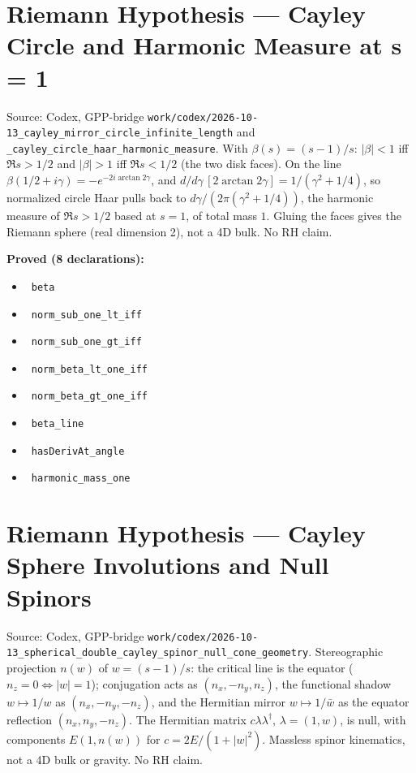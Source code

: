 \documentclass{report}
\theoremstyle{definition}
\begin{document}
\section{Riemann Hypothesis --- Cayley Circle and Harmonic Measure at s = 1}
Source: Codex, GPP-bridge \texttt{work/codex/2026-10-13\_cayley\_mirror\_circle\_infinite\_length} and \texttt{\_cayley\_circle\_haar\_harmonic\_measure}. With $\beta(s)=(s-1)/s$: $|\beta|<1$ iff $\Re s>1/2$ and $|\beta|>1$ iff $\Re s<1/2$ (the two disk faces). On the line $\beta(1/2+i\gamma)=-e^{-2i\arctan 2\gamma}$, and $d/d\gamma\,[2\arctan 2\gamma]=1/(\gamma^2+1/4)$, so normalized circle Haar pulls back to $d\gamma/(2\pi(\gamma^2+1/4))$, the harmonic measure of $\Re s>1/2$ based at $s=1$, of total mass $1$. Gluing the faces gives the Riemann sphere (real dimension 2), not a 4D bulk. No RH claim.

\noindent\textbf{Proved (8 declarations):}
\begin{itemize}
  \item {}\leanok\ \texttt{beta}
  \item {}\leanok\ \texttt{norm\_sub\_one\_lt\_iff}
  \item {}\leanok\ \texttt{norm\_sub\_one\_gt\_iff}
  \item {}\leanok\ \texttt{norm\_beta\_lt\_one\_iff}
  \item {}\leanok\ \texttt{norm\_beta\_gt\_one\_iff}
  \item {}\leanok\ \texttt{beta\_line}
  \item {}\leanok\ \texttt{hasDerivAt\_angle}
  \item {}\leanok\ \texttt{harmonic\_mass\_one}
\end{itemize}

\section{Riemann Hypothesis --- Cayley Sphere Involutions and Null Spinors}
Source: Codex, GPP-bridge \texttt{work/codex/2026-10-13\_spherical\_double\_cayley\_spinor\_null\_cone\_geometry}. Stereographic projection $n(w)$ of $w=(s-1)/s$: the critical line is the equator ($n_z=0\iff|w|=1$); conjugation acts as $(n_x,-n_y,n_z)$, the functional shadow $w\mapsto1/w$ as $(n_x,-n_y,-n_z)$, and the Hermitian mirror $w\mapsto1/\bar w$ as the equator reflection $(n_x,n_y,-n_z)$. The Hermitian matrix $c\lambda\lambda^\dagger$, $\lambda=(1,w)$, is null, with components $E(1,n(w))$ for $c=2E/(1+|w|^2)$. Massless spinor kinematics, not a 4D bulk or gravity. No RH claim.
\end{document}
